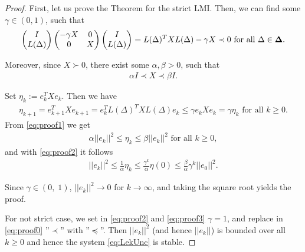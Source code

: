\begin{proof}
	First, let us prove the Theorem for the strict LMI. Then, we can find some $\gamma \in (0,1)$, such that
	\begin{align}
	\label{eq:proof0}
	\begin{pmatrix}
	I \\ L(\Delta)
	\end{pmatrix}
	\begin{pmatrix}
	-\gamma X & 0 \\ 0 & X
	\end{pmatrix}
	\begin{pmatrix}
	I \\ L(\Delta)
	\end{pmatrix} = L(\Delta)^T X L(\Delta) - \gamma X \prec 0 \text{ for all } \Delta \in \mathbf{\Delta}.
	\end{align}	
	

	Moreover, since $X \succ 0$, there exist some $\alpha, \beta > 0$, such that 
	\begin{align}
	\label{eq:proof1}
	\alpha I \prec X \prec \beta I.
	\end{align}
	
	Set $\eta_k := e_k^T X e_k$. Then we have
	\begin{align}
	\label{eq:proof2}
	\eta_{k+1} = e_{k+1}^T X e_{k+1} = e_k^T L(\Delta)^T X L(\Delta) e_k \leq \gamma e_k X e_k = \gamma \eta_k \text{ for all } k\geq 0.
	\end{align}
    From \eqref{eq:proof1} we get
	\begin{align}
	\alpha || e_k ||^2 \leq \eta_k \leq \beta ||e_k||^2 \text{ for all } k\geq 0,
	\end{align}
	and with \eqref{eq:proof2} it follows
	\begin{align}
	\label{eq:proof3}
	||e_k||^2 \leq \frac{1}{\alpha}\eta_k \leq \frac{\gamma^k}{\alpha}\eta(0) \leq \frac{\beta}{\alpha} \gamma^k ||e_0||^2. 
	\end{align}
	
	
	Since $\gamma \in (0,\;1)$, $||e_k||^2 \to 0$ for $k \to \infty$, and taking the square root yields the proof. 
	
	For not strict case, we set in \eqref{eq:proof2} and \eqref{eq:proof3} $\gamma = 1$, and replace in \eqref{eq:proof0} ''$\prec$'' with ''$\preceq$''. Then $||e_k||^2$ (and hence $||e_k||$) is bounded over all $k\geq 0$ and hence the system \eqref{eq:LekUnc} is stable. 
	
\end{proof}

